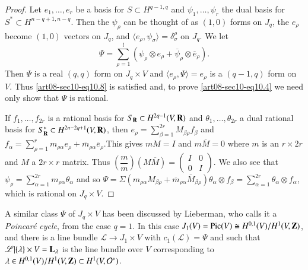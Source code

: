 \begin{proof}
Let $e_{1},\ldots,e_{r}$ be a basis for $S\subset H^{q-1,q}$ and $\psi_{1},\ldots,\psi_{r}$ the dual basis for $S^{*}\subset H^{n-q+1,n-q}$. Then the $\psi_{\rho}$ can be thought of as $(1,0)$ forms on $J_{q}$, the $e_{\rho}$ become $(1,0)$ vectors on $J_{q}$, and $\langle e_{\rho},\psi_{\sigma}\rangle =\delta^{\rho}_{\sigma}$ on $J_{q}$. We let
\begin{equation*}
\Psi =\sum\limits^{l}_{\rho=1}(\psi_{\rho}\otimes e_{\rho}+\overline{\psi}_{\rho}\otimes \overline{e}_{\rho}).\tag{10.9}\label{art08-sec10-eq10.9}
\end{equation*}
Then $\Psi$ is a real $(q,q)$ form on $J_{q}\times V$ and $\langle e_{\rho},\Psi\rangle=e_{\rho}$ is a $(q-1,q)$ form on $V$. Thus \eqref{art08-sec10-eq10.8} is satisfied and, to prove \eqref{art08-sec10-eq10.4} we need only show that $\Psi$ is rational.

If $f_{1},\ldots,f_{2r}$ is a rational basis for $S_{\mathbf{R}}\subset H^{2q-1}(V,\mathbf{R})$ and $\theta_{1},\ldots,\theta_{2r}$ a dual rational basis for $S^{*}_{\mathbf{R}}\subset H^{2n-2q+1}(V,\mathbf{R})$, then $e_{\rho}=\sum\limits^{2r}_{\beta=1}M_{\beta\rho}f_{\beta}$ and $f_{\alpha}=\sum\limits^{r}_{\rho=1}m_{\rho\alpha}e_{\rho}+\overline{m}_{\rho\alpha}\overline{e}_{\rho}$.\pageoriginale This gives $mM=I$ and $m\overline{M}=0$ where $m$ is an $r\times 2r$ and $M$ a $2r\times r$ matrix. Thus $\left(\dfrac{m}{m}\right)(M\overline{M})=\left(\begin{smallmatrix} I & 0 \\ 0 & I\end{smallmatrix}\right)$. We also see that $\psi_{\rho}=\sum\limits^{2r}_{\alpha=1}m_{\rho\alpha}\theta_{\alpha}$ and so $\Psi=\Sigma(m_{\rho\alpha}M_{\beta\rho}+\overline{m}_{\rho\alpha}\overline{M}_{\beta\rho})\theta_{\alpha}\otimes f_{\beta}=\sum\limits^{2r}_{\alpha=1}\theta_{\alpha}\otimes f_{\alpha}$, which is rational on $J_{q}\times V$.
\end{proof}

\begin{remark*}
A similar class $\Psi$ of $J_{q}\times V$ has been discussed by Lieberman, who calls it a {\em Poincar\'e cycle}, from the case $q=1$. In this case $J_{1}(V)=\operatorname{\mathrm{Pic}}(V)\cong H^{0,1}(V)/H^{1}(V,\mathbf{Z})$, and there is a line bundle $\mathscr{L}\to J_{1}\times V$ with $c_{1}(\mathscr{L})=\Psi$ and such that $\mathscr{L}|\{\lambda\}\times V=\mathbf{L}_{\lambda}$ is the line bundle over $V$ corresponding to $\lambda\in H^{0,1}(V)/H^{1}(V,\mathbf{Z})\subset H^{1}(V,\mathcal{O}^{*})$.
\end{remark*}

